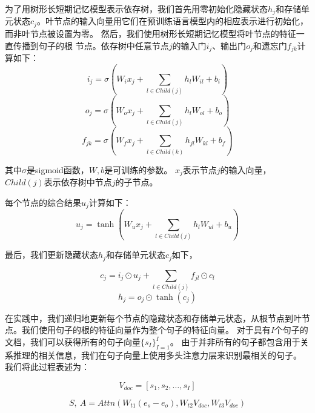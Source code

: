 \documentclass[bachelor]{thesis-uestc}
\begin{document}
为了用树形长短期记忆模型表示依存树，我们首先用零初始化隐藏状态$h_j$和存储单元状态$c_j$。叶节点的输入向量用它们在预训练语言模型内的相应表示进行初始化，而非叶节点被设置为零。
然后，我们使用树形长短期记忆模型\cite{miwa-bansal-2016-end}将叶节点的特征一直传播到句子的根
节点。依存树中任意节点$j$的输入门$i_j$、输出门$o_j$和遗忘门$f_{jk}$计算如下：
\begin{equation}
    i_j = \sigma(W_ix_j +\sum_{l \in Child(j)}h_{l}W_{il}+b_i) 
\end{equation}
\begin{equation}
    o_j = \sigma(W_ox_j +\sum_{l \in Child(j)}h_{l}W_{ol}+b_o) 
\end{equation}
\begin{equation}
    f_{jk} = \sigma(W_fx_j +\sum_{l \in Child(k)}h_{jl}W_{kl}+b_f)
\end{equation}

其中$\sigma$是sigmoid函数，$W, b$是可训练的参数。
$x_j$表示节点$j$的输入向量，$Child(j)$表示依存树中节点$j$的子节点。\par
每个节点的综合结果$u_j$计算如下：
\begin{equation}
    u_j = \tanh(W_ux_j +\sum_{l \in Child(j)}h_{l}W_{ul}+b_u)
\end{equation}
\par

最后，我们更新隐藏状态$h_j$和存储单元状态$c_j$如下，

\begin{equation}
    c_j = i_j \odot u_j + \sum_{l \in Child(j)} f_{jl} \odot c_l
\end{equation}
\begin{equation}
    h_j = o_j \odot \tanh(c_j)
\end{equation}
\par

在实践中，我们递归地更新每个节点的隐藏状态和存储单元状态，从根节点到叶节点。我们使用句子的根的特征向量作为整个句子的特征向量。
对于具有$I$个句子的文档，我们可以获得所有的句子向量$\{s_I\}_{I=1}^{I}$。
由于并非所有的句子都包含用于关系推理的相关信息，我们在句子向量上使用多头注意力层来识别最相关的句子。
我们将此过程表述为：

\begin{equation}
    V_{doc} = [s_1, s_2, \dots, s_I]
\end{equation}

\begin{equation}
    S,\  A = Attn(W_{t1}(e_s-e_o), W_{t2} V_{doc}, W_{t3} V_{doc})
\end{equation}\label{Attn}
\end{document}
